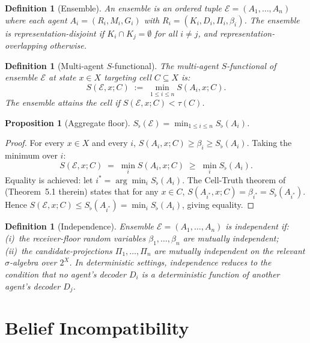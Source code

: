 \documentclass[twocolumn,11pt,a4paper]{article}
\newtheorem{proposition}[theorem]{Proposition}
\newtheorem{definition}[theorem]{Definition}
\theoremstyle{remark}
\newcommand{\Sflat}{S_{\flat}}
\newcommand{\tol}{\tau}
\newcommand{\Ens}{\mathcal{E}}            %
\begin{document}
\begin{definition}[Ensemble]
\label{def:ensemble}
An \emph{ensemble} is an ordered tuple $\Ens = (A_1, \ldots, A_n)$ where
each agent $A_i = (R_i, M_i, G_i)$ with $R_i = (K_i, D_i, \Pi_i, \beta_i)$.
The ensemble is \emph{representation-disjoint} if $K_i \cap K_j = \emptyset$
for all $i \neq j$, and \emph{representation-overlapping} otherwise.
\end{definition}

\begin{definition}[Multi-agent $S$-functional]
\label{def:multi-s}
The \emph{multi-agent $S$-functional} of ensemble $\Ens$ at state $x \in X$
targeting cell $C \subseteq X$ is:
\[
  S(\Ens, x; C) \;:=\; \min_{1 \le i \le n} S(A_i, x; C).
\]
The ensemble attains the cell if $S(\Ens, x; C) < \tol(C)$.
\end{definition}

\begin{proposition}[Aggregate floor]
\label{prop:aggregate-floor}
$\Sflat(\Ens) = \min_{1 \le i \le n} \Sflat(A_i)$.
\end{proposition}
\begin{proof}
For every $x \in X$ and every $i$, $S(A_i, x; C) \ge \beta_i \ge
\Sflat(A_i)$.  Taking the minimum over $i$:
\[
  S(\Ens, x; C) \;=\; \min_i S(A_i, x; C) \;\ge\; \min_i \Sflat(A_i).
\]
Equality is achieved: let $i^* = \arg\min_i \Sflat(A_i)$.  The Cell-Truth
theorem of~\cite{sachikonye2025agents} (Theorem~5.1 therein) states that
for any $x \in C$, $S(A_{i^*}, x; C) = \beta_{i^*} = \Sflat(A_{i^*})$.
Hence $S(\Ens, x; C) \le \Sflat(A_{i^*}) = \min_i \Sflat(A_i)$, giving
equality.
\end{proof}

\begin{definition}[Independence]
\label{def:independence}
Ensemble $\Ens = (A_1, \ldots, A_n)$ is \emph{independent} if: (i)~the
receiver-floor random variables $\beta_1, \ldots, \beta_n$ are mutually
independent; (ii)~the candidate-projections $\Pi_1, \ldots, \Pi_n$ are
mutually independent on the relevant $\sigma$-algebra over $2^X$.  In
deterministic settings, independence reduces to the condition that no agent's
decoder $D_i$ is a deterministic function of another agent's decoder $D_j$.
\end{definition}

\section{Belief Incompatibility}
\label{sec:belief}
\end{document}
